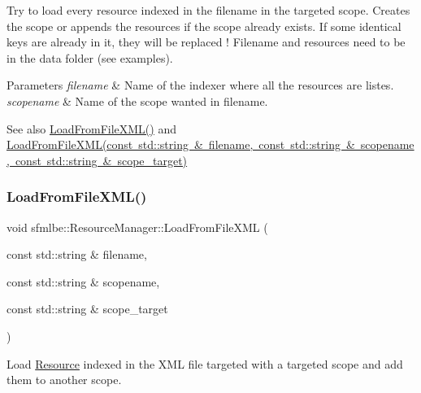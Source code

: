 Try to load every resource indexed in the filename in the targeted scope. Creates the scope or appends the resources if the scope already exists. If some identical keys are already in it, they will be replaced ! Filename and resources need to be in the data folder (see examples). 
\begin{DoxyParams}{Parameters}
{\em filename} & Name of the indexer where all the resources are listes. \\
\hline
{\em scopename} & Name of the scope wanted in filename. \\
\hline
\end{DoxyParams}
\begin{DoxySeeAlso}{See also}
\mbox{\hyperlink{classsfmlbe_1_1_resource_manager_a8f99da24868d355227f641dc50db2bd2}{Load\+From\+File\+X\+M\+L()}} and \mbox{\hyperlink{classsfmlbe_1_1_resource_manager_a99707b50bdf61ac1daadd65027a1ae2b}{Load\+From\+File\+X\+M\+L(const std\+::string \& filename, const std\+::string \& scopename, const std\+::string \& scope\+\_\+target)}} 
\end{DoxySeeAlso}
\mbox{\label{classsfmlbe_1_1_resource_manager_a99707b50bdf61ac1daadd65027a1ae2b}} 
\subsubsection{\texorpdfstring{Load\+From\+File\+X\+M\+L()}{LoadFromFileXML()}\hspace{0.1cm}{\footnotesize\ttfamily [3/3]}}
{\footnotesize\ttfamily void sfmlbe\+::\+Resource\+Manager\+::\+Load\+From\+File\+X\+ML (\begin{DoxyParamCaption}\item[{const std\+::string \&}]{filename,  }\item[{const std\+::string \&}]{scopename,  }\item[{const std\+::string \&}]{scope\+\_\+target }\end{DoxyParamCaption})}



Load \mbox{\hyperlink{classsfmlbe_1_1_resource}{Resource}} indexed in the X\+ML file targeted with a targeted scope and add them to another scope. 

